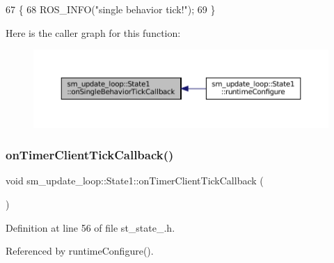 \begin{DoxyCode}
67     \{
68         ROS\_INFO(\textcolor{stringliteral}{"single behavior tick!"});
69     \}
\end{DoxyCode}
Here is the caller graph for this function\+:
\nopagebreak
\begin{figure}[H]
\begin{center}
\leavevmode
\includegraphics[width=350pt]{structsm__update__loop_1_1State1_ad15fb64f4f918c423038180d434d7220_icgraph}
\end{center}
\end{figure}
\mbox{\label{structsm__update__loop_1_1State1_af132641f3167a2224249c70d072b6574}} 
\subsubsection{\texorpdfstring{on\+Timer\+Client\+Tick\+Callback()}{onTimerClientTickCallback()}}
{\footnotesize\ttfamily void sm\+\_\+update\+\_\+loop\+::\+State1\+::on\+Timer\+Client\+Tick\+Callback (\begin{DoxyParamCaption}{ }\end{DoxyParamCaption})\hspace{0.3cm}{\ttfamily [inline]}}



Definition at line 56 of file st\+\_\+state\+\_.\+h.



Referenced by runtime\+Configure().



